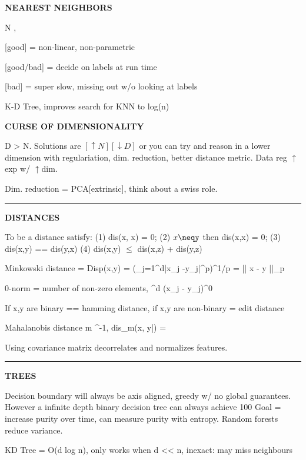 \documentclass[a4paper,twoside,twocolumn]{article}
\begin{document}
{{}

\textbf{NEAREST NEIGHBORS}

\setlength{\parindent}{0pt}
{\scriptsize
N \rightarrow \inf, 

[good] = non-linear, non-parametric

[good/bad] = decide on labels at run time

[bad] = super slow, missing out w/o looking at labels

K-D Tree, improves search for KNN to log(n)
}

\textbf{CURSE OF DIMENSIONALITY}

\setlength{\parindent}{0pt}
{\scriptsize
D > N. Solutions are $[\uparrow N][\downarrow D]$ or you can try and reason in a lower dimension with regulariation, dim. reduction, better distance metric. Data reg $\uparrow$ exp w/ $\uparrow$dim.

Dim. reduction = PCA[extrinsic], think about a swiss role.

\noindent\rule{8cm}{0.4pt}
}

\textbf{DISTANCES}

\setlength{\parindent}{0pt}
{\scriptsize
To be a distance satisfy: (1) dis(x, x) = 0; (2) $x\neqy$ then dis(x,x) = 0; (3) dis(x,y) == dis(y,x) (4) dis(x,y) $\leq$ dis(x,z) + dis(y,z)

Minkowski distance = Disp(x,y) = (\Sum_{j=1}^{d}|x_j -y_j|^p)^{1/p} = || x - y ||_p

0-norm = number of non-zero elements, \Sum^d (x_j - y_j)^0

If x,y are binary == hamming distance, if x,y are non-binary = edit distance

Mahalanobis distance m \Sigma^{-1}, dis_m(x, y|\Sigma) = 

Using covariance matrix decorrelates and normalizes features.

\noindent\rule{8cm}{0.4pt}
}

\textbf{TREES}

\setlength{\parindent}{0pt}
{\scriptsize
Decision boundary will always be axis aligned, greedy w/ no global guarantees. However a infinite depth binary decision tree can always achieve 100%
Goal = increase purity over time, can measure purity with entropy. Random forests reduce variance.

KD Tree = O(d log n), only works when d << n, inexact: may miss neighbours

}}
\end{document}
